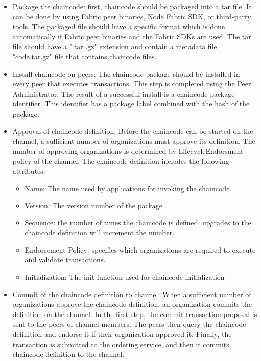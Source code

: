 \documentclass[sigconf,natbib=false]{acmart}
\begin{document}
    \begin{itemize}
        \item Package the chaincode: first, chaincode should be packaged into a tar file. It can be done by using Fabric peer binaries, Node Fabric SDK, or third-party tools. The packaged file should have a specific format which is done automatically if Fabric peer binaries and the Fabric SDKs are used. The tar file should have a ".tar .gz" extension and contain a metadata file "code.tar.gz" file that contains chaincode files.
        \item Install chaincode on peers: The chaincode package should be installed in every peer that executes transactions. This step is completed using the Peer Administrator. The result of a successful install is a chaincode package identifier. This identifier has a package label combined with the hash of the package.
        \item Approval of chaincode definition: Before the chaincode can be started on the channel, a sufficient number of organizations must approve its definition. The number of approving organizations is determined by LifecycleEndorsment policy of the channel. The chaincode definition includes the following attributes:
        \begin{itemize}
            \item Name: The name used by applications for invoking the chaincode.
            \item Version: The version number of the package
            \item Sequence: the number of times the chaincode is defined. upgrades to the chaincode definition will increment the number.
            \item Endorsement Policy: specifies which organizations are required to execute and validate transactions.
            \item Initialization: The init function used for chaincode initialization
        \end{itemize}
        \item Commit of the chaincode definition to channel: When a sufficient number of organizations approve the chaincode definition, an organization commits the definition on the channel. In the first step, the commit transaction proposal is sent to the peers of channel members. The peers then query the chaincode definition and endorse it if their organization approved it. Finally, the transaction is submitted to the ordering service, and then it commits chaincode definition to the channel.\cite{chaincode}
    \end{itemize}
\end{document}
